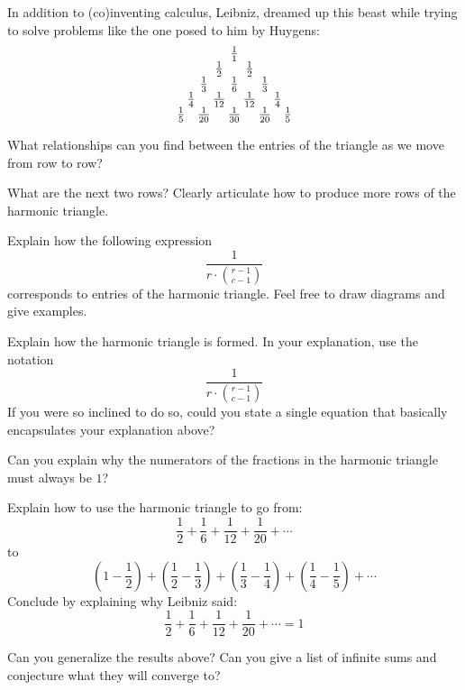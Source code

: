 \documentclass{ximera}
\begin{document}
In addition to (co)inventing calculus, Leibniz, dreamed up this beast
while trying to solve problems like the one posed to him by Huygens:
\[
\begin{tabular}{@{\,}c@{\,}c@{\,}c@{\,}c@{\,}c@{\,}c@{\,}c@{\,}c@{\,}c@{\,}}
& & & & $\frac{1}{1}$ & & & & \\
& & & $\frac{1}{2}$ & & $\frac{1}{2}$ & & & \\
& & $\frac{1}{3}$ & & $\frac{1}{6}$ & & $\frac{1}{3}$ & & \\
& $\frac{1}{4}$ & & $\frac{1}{12}$ & & $\frac{1}{12}$ & & $\frac{1}{4}$ &\\
$\frac{1}{5}$ & & $\frac{1}{20}$ & & $\frac{1}{30}$ & & $\frac{1}{20}$ & & $\frac{1}{5}$
\end{tabular}
\]

\begin{question} 
What relationships can you find between the entries of the triangle as
we move from row to row?
\end{question}


\begin{question} 
What are the next two rows? Clearly articulate how to produce more
rows of the harmonic triangle.
\end{question}

\begin{question} Explain how the following expression
\[
\frac{1}{r\cdot\binom{r-1}{c-1}}
\]
corresponds to entries of the harmonic triangle. Feel free to draw
diagrams and give examples.
\end{question}

\begin{question}  
Explain how the harmonic triangle is formed. In your explanation, use
the notation
\[
\frac{1}{r\cdot\binom{r-1}{c-1}}
\]
If you were so inclined to do so, could you state a single equation
that basically encapsulates your explanation above?
\end{question}

\begin{question} 
Can you explain why the numerators of the fractions in the harmonic
triangle must always be $1$?
\end{question}


\begin{question} Explain how to use the harmonic triangle to go from:
\[
\frac{1}{2} + \frac{1}{6} + \frac{1}{12} + \frac{1}{20}+\cdots
\]
to
\[
\left(1 - \frac{1}{2}\right) + \left(\frac{1}{2}-\frac{1}{3}\right) + 
\left(\frac{1}{3}- \frac{1}{4}\right) + \left(\frac{1}{4}-\frac{1}{5}\right) + \cdots 
\]
Conclude by explaining why Leibniz said:
\[
\frac{1}{2} + \frac{1}{6} + \frac{1}{12} + \frac{1}{20}+\cdots = 1
\]
\end{question}

\begin{question} 
Can you generalize the results above? Can you give a list of infinite
sums and conjecture what they will converge to?
\end{question}
\end{document}
